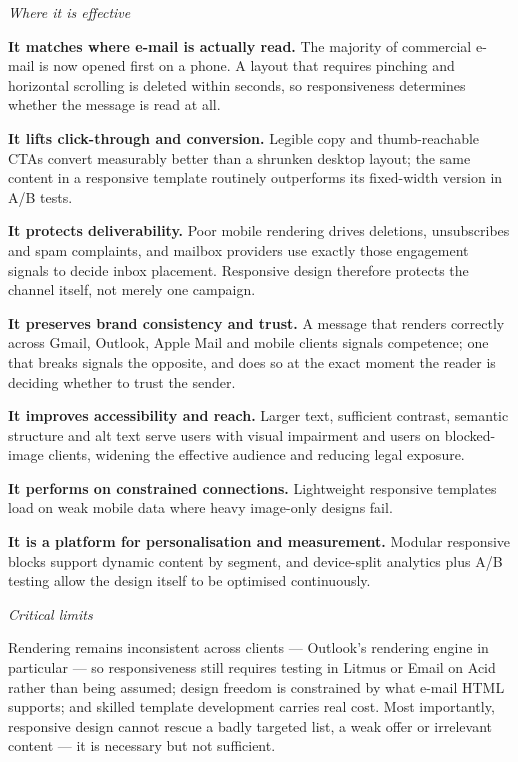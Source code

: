 \begin{qlist}
\textit{Where it is effective}
\begin{apts}
\item \textbf{It matches where e-mail is actually read.} The majority of
      commercial e-mail is now opened first on a phone. A layout that requires
      pinching and horizontal scrolling is deleted within seconds, so
      responsiveness determines whether the message is read at all.
\item \textbf{It lifts click-through and conversion.} Legible copy and
      thumb-reachable CTAs convert measurably better than a shrunken desktop
      layout; the same content in a responsive template routinely outperforms
      its fixed-width version in A/B tests.
\item \textbf{It protects deliverability.} Poor mobile rendering drives
      deletions, unsubscribes and spam complaints, and mailbox providers use
      exactly those engagement signals to decide inbox placement. Responsive
      design therefore protects the channel itself, not merely one campaign.
\item \textbf{It preserves brand consistency and trust.} A message that renders
      correctly across Gmail, Outlook, Apple Mail and mobile clients signals
      competence; one that breaks signals the opposite, and does so at the exact
      moment the reader is deciding whether to trust the sender.
\item \textbf{It improves accessibility and reach.} Larger text, sufficient
      contrast, semantic structure and alt text serve users with visual
      impairment and users on blocked-image clients, widening the effective
      audience and reducing legal exposure.
\item \textbf{It performs on constrained connections.} Lightweight responsive
      templates load on weak mobile data where heavy image-only designs fail.
\item \textbf{It is a platform for personalisation and measurement.} Modular
      responsive blocks support dynamic content by segment, and device-split
      analytics plus A/B testing allow the design itself to be optimised
      continuously.
\end{apts}

\textit{Critical limits}
\begin{apts}\setcounter{enumi}{7}
\item Rendering remains inconsistent across clients --- Outlook's rendering
      engine in particular --- so responsiveness still requires testing in
      Litmus or Email on Acid rather than being assumed; design freedom is
      constrained by what e-mail HTML supports; and skilled template
      development carries real cost. Most importantly, responsive design cannot
      rescue a badly targeted list, a weak offer or irrelevant content --- it is
      necessary but not sufficient.
\end{apts}


\end{qlist}
